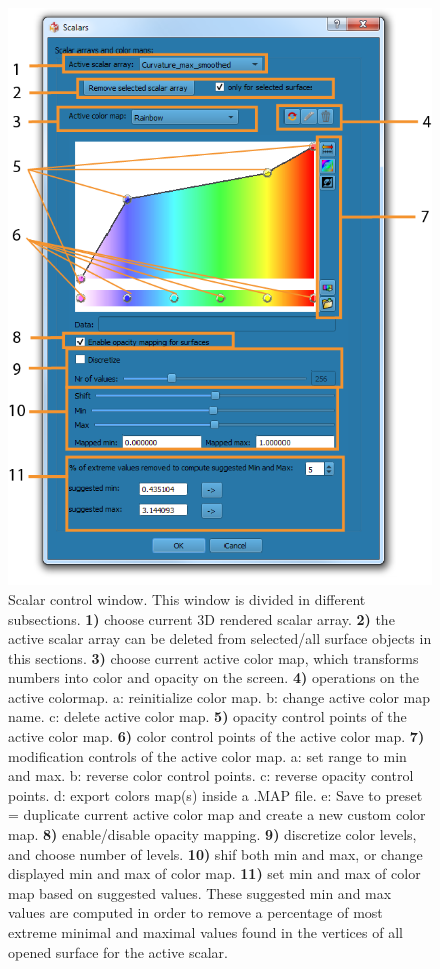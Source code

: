 \begin{figure}
  \centering
  \includegraphics[scale=1]{images/11/scalar_rendering_option_window2.png}
\caption{Scalar control window. This window is divided in different subsections. \textbf{1)} choose current 3D rendered scalar array.  \textbf{2)} the active scalar array can be deleted from selected/all surface objects in this sections. \textbf{3)} choose current active color map, which transforms numbers into color and opacity on the screen. \textbf{4)} operations on the active colormap. a: reinitialize color map.  b: change active color map name. c: delete active color map. \textbf{5)} opacity control points of the active color map. \textbf{6)} color control points of the active color map. \textbf{7)} modification controls of the active color map. a: set range to min and max. b: reverse color control points. c: reverse opacity control points. d: export colors map(s) inside a .MAP file. e: Save to preset = duplicate current active color map and create a new custom color map. \textbf{8)} enable/disable opacity mapping. \textbf{9)} discretize color levels, and choose number of levels. \textbf{10)} shif both min and max, or change displayed min and max of color map. \textbf{11)} set min and max of color map based on suggested values. These suggested min and max values are computed in order to remove a percentage of most extreme minimal and maximal values found in the vertices of all opened surface for the active scalar.}	
\label{scalar_rendering_options_window}
 \end{figure}


